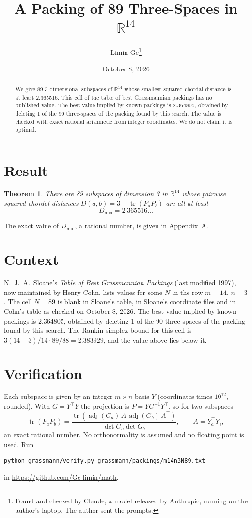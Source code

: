 \documentclass[11pt,a4paper]{article}
\title{A Packing of 89 Three-Spaces in $\mathbb{R}^{14}$}
\author{Limin Ge\thanks{Found and checked by Claude, a model released by Anthropic, running on the author's laptop. The author sent the prompts.}}
\date{October 8, 2026}
\newtheorem*{theorem}{Theorem}
\begin{document}
\maketitle
\begin{abstract}
We give 89 3-dimensional subspaces of $\mathbb{R}^{14}$ whose smallest squared chordal distance is at least 2.365516. This cell of the table of best Grassmannian packings has no published value. The best value implied by known packings is 2.364805, obtained by deleting 1 of the 90 three-spaces of the packing found by this search. The value is checked with exact rational arithmetic from integer coordinates. We do not claim it is optimal.
\end{abstract}

\section{Result}
\begin{theorem}
There are 89 subspaces of dimension 3 in $\mathbb{R}^{14}$ whose pairwise squared chordal distances $D(a,b) = 3 - \operatorname{tr}(P_aP_b)$ are all at least
\[ D_{\min} = 2.365516\ldots \]
\end{theorem}
The exact value of $D_{\min}$, a rational number, is given in Appendix~A.


\section{Context}
N.~J.~A.~Sloane's \emph{Table of Best Grassmannian Packings} (last modified 1997), now maintained by Henry Cohn, lists values for some $N$ in the row $m=14$, $n=3$. The cell $N=89$ is blank in Sloane's table, in Sloane's coordinate files and in Cohn's table as checked on October 8, 2026. The best value implied by known packings is 2.364805, obtained by deleting 1 of the 90 three-spaces of the packing found by this search. The Rankin simplex bound for this cell is $3(14-3)/14\cdot 89/88 = 2.383929$, and the value above lies below it.


\section{Verification}
Each subspace is given by an integer $m\times n$ basis $Y$ (coordinates times $10^{12}$, rounded). With $G=Y^\top Y$ the projection is $P=YG^{-1}Y^\top$, so for two subspaces
\[ \operatorname{tr}(P_aP_b)=\frac{\operatorname{tr}(\operatorname{adj}(G_a)\,A\,\operatorname{adj}(G_b)\,A^\top)}{\det G_a\det G_b},\qquad A=Y_a^\top Y_b, \]
an exact rational number. No orthonormality is assumed and no floating point is used. Run
\begin{verbatim}
python grassmann/verify.py grassmann/packings/m14n3N89.txt
\end{verbatim}
in \url{https://github.com/Ge-limin/math}.
\end{document}
